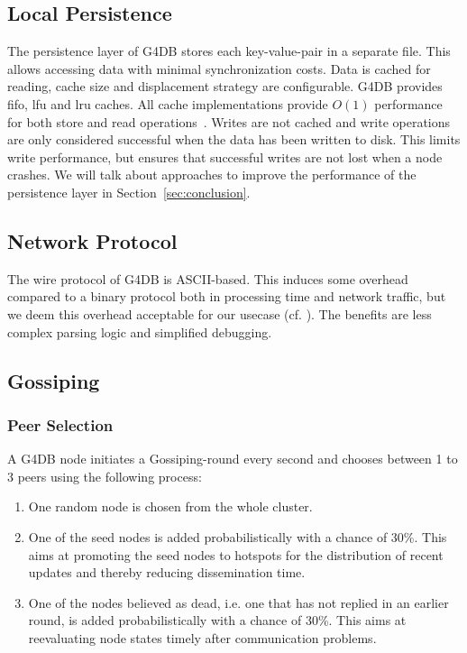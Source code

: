 \subsection{Local Persistence}
The persistence layer of G4DB stores each key-value-pair in a separate file.
This allows accessing data with minimal synchronization costs.
Data is cached for reading, cache size and displacement strategy are configurable.
G4DB provides \ac{fifo}, \ac{lfu} and \ac{lru} caches.
All cache implementations provide $O(1)$ performance for both store and read operations~\cite{Malike2017, Ketan2010}.
Writes are not cached and write operations are only considered successful when the data has been written to disk.
This limits write performance, but ensures that successful writes are not lost when a node crashes.
We will talk about approaches to improve the performance of the persistence layer in Section~\ref{sec:conclusion}.

\subsection{Network Protocol}
The wire protocol of G4DB is ASCII-based.
This induces some overhead compared to a binary protocol both in processing time and network traffic,
but we deem this overhead acceptable for our usecase (cf. \cite{Azad2017}).
The benefits are less complex parsing logic and simplified debugging.

\subsection{Gossiping}
\subsubsection{Peer Selection}
\label{sec:implementation:gossip:peers}
A G4DB node initiates a Gossiping-round every second and chooses between 1 to 3 peers using the following process:

\begin{enumerate}
	\item One random node is chosen from the whole cluster.
	\item One of the seed nodes is added probabilistically with a chance of 30\%.
		This aims at promoting the seed nodes to hotspots for the distribution of recent updates
		and thereby reducing dissemination time.
	\item One of the nodes believed as dead, i.e. one that has not replied in an earlier round, is added
		probabilistically with a chance of 30\%.
		This aims at reevaluating node states timely after communication problems.
\end{enumerate}

